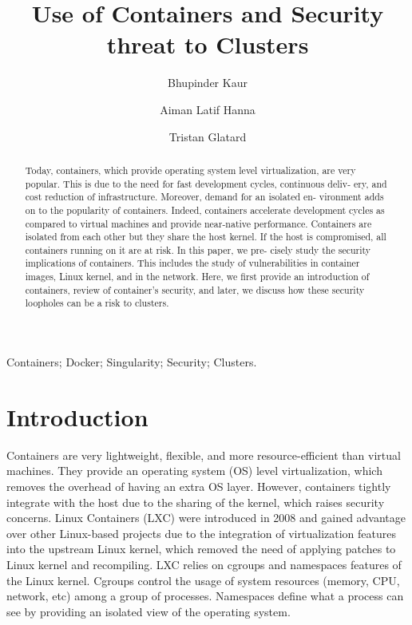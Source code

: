 \documentclass[a4paper,num-refs]{oup-contemporary}
\title{Use of Containers and Security threat to Clusters}
\begin{document}
\author[1]{Bhupinder Kaur}
\author[1]{Aiman Latif Hanna}
\author[1]{Tristan Glatard}


\maketitle

\begin{abstract} 

Today, containers, which provide operating system level virtualization, are very
popular. This is due to the need for fast development cycles, continuous deliv-
ery, and cost reduction of infrastructure. Moreover, demand for an isolated en-
vironment adds on to the popularity of containers. Indeed, containers accelerate
development cycles as compared to virtual machines and provide near-native performance.
Containers are isolated from each other but they share the host kernel. If the host
is compromised, all containers running on it are at risk. In this paper, we pre-
cisely study the security implications of containers. This includes the study of
vulnerabilities in container images, Linux kernel, and in the network. Here, we
first provide an introduction of containers, review of container’s security, and
later, we discuss how these security loopholes can be a risk to clusters.
\end{abstract}

\begin{keywords}
Containers; Docker; Singularity; Security; 
Clusters.
\end{keywords}

\section{Introduction}

Containers are very lightweight, flexible, and more resource-efficient than virtual
machines. They provide an operating system (OS) level virtualization, which
removes the overhead of having an extra OS layer. However, containers tightly
integrate with the host due to the sharing of the kernel, which raises security
concerns. Linux Containers (LXC) were introduced in 2008 and gained advantage 
over other Linux-based projects due to the integration of virtualization features 
into the upstream Linux kernel, which removed the need of applying patches to
Linux kernel and recompiling. LXC relies on cgroups and namespaces features
of the Linux kernel. Cgroups control the usage of system resources (memory, CPU,
network, etc) among a group of processes. Namespaces define what a process can
see by providing an isolated view of the operating system.
\end{document}
